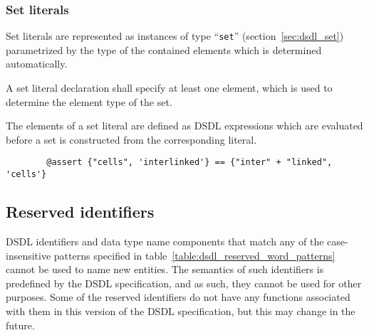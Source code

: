 \subsubsection{Set literals}

Set literals are represented as instances of type ``\verb|set|'' (section~\ref{sec:dsdl_set})
parametrized by the type of the contained elements which is determined automatically.

A set literal declaration shall specify at least one element,
which is used to determine the element type of the set.

The elements of a set literal are defined as DSDL expressions which are evaluated before a set is constructed
from the corresponding literal.

\begin{remark}
    \begin{verbatim}
        @assert {"cells", 'interlinked'} == {"inter" + "linked", 'cells'}
    \end{verbatim}
\end{remark}

\subsection{Reserved identifiers}\label{sec:dsdl_reserved_identifiers}

DSDL identifiers and data type name components that match any of the
case-insensitive patterns specified in table~\ref{table:dsdl_reserved_word_patterns}
cannot be used to name new entities.
The semantics of such identifiers is predefined by the DSDL specification,
and as such, they cannot be used for other purposes.
Some of the reserved identifiers do not have any functions associated with them
in this version of the DSDL specification, but this may change in the future.

